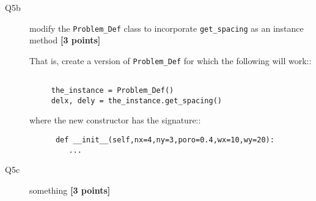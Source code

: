 \documentclass{article}
\begin{document}
\begin{description}  

  
\item[Q5b] modify the \verb+Problem_Def+ class to
  incorporate \verb+get_spacing+ as an instance method \textbf{[3 points]}

  That is, create a version of \verb+Problem_Def+ for which the following will work::

\begin{verbatim}

     the_instance = Problem_Def()
     delx, dely = the_instance.get_spacing()

\end{verbatim}

where the new constructor has the signature::

\begin{verbatim}
      def __init__(self,nx=4,ny=3,poro=0.4,wx=10,wy=20):
         ...
\end{verbatim}

\item[Q5c] something \textbf{[3 points]}
  
\end{description}  
\end{document}
